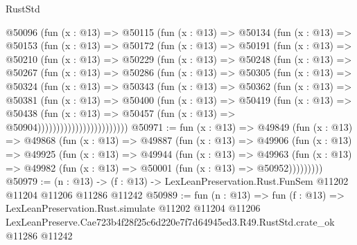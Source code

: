 \begin{lexlean}{RustStd}
\begin{coremodule}
          @50096
            (fun (x : @13) =>
            @50115
              (fun (x : @13) =>
              @50134
                (fun (x : @13) =>
                @50153
                  (fun (x : @13) =>
                  @50172
                    (fun (x : @13) =>
                    @50191
                      (fun (x : @13) =>
                      @50210
                        (fun (x : @13) =>
                        @50229
                          (fun (x : @13) =>
                          @50248
                            (fun (x : @13) =>
                            @50267
                              (fun (x : @13) =>
                              @50286
                                (fun (x : @13) =>
                                @50305
                                  (fun (x : @13) =>
                                  @50324
                                    (fun (x : @13) =>
                                    @50343
                                      (fun (x : @13) =>
                                      @50362
                                        (fun (x : @13) =>
                                        @50381
                                          (fun (x : @13) =>
                                          @50400
                                            (fun (x : @13) =>
                                            @50419
                                              (fun (x : @13) =>
                                              @50438
                                                (fun (x : @13) =>
                                                @50457
                                                  (fun (x : @13) => @50904))))))))))))))))))))))))
@50971 := fun (x : @13) =>
  @49849
    (fun (x : @13) =>
    @49868
      (fun (x : @13) =>
      @49887
        (fun (x : @13) =>
        @49906
          (fun (x : @13) =>
          @49925
            (fun (x : @13) =>
            @49944
              (fun (x : @13) =>
              @49963
                (fun (x : @13) => @49982 (fun (x : @13) => @50001 (fun (x : @13) => @50952)))))))))
@50979 := (n : @13) ->
  (f : @13) -> LexLeanPreservation.Rust.FunSem @11202 @11204 @11206 @11286 @11242
@50989 := fun (n : @13) =>
  fun (f : @13) =>
  LexLeanPreservation.Rust.simulate
    @11202
    @11204
    @11206
    LexLeanPreserve.Cae723b4f28f25c6d220e7f7d64945ed3.R49.RustStd.crate_ok
    @11286
    @11242
\end{coremodule}
\end{lexlean}
